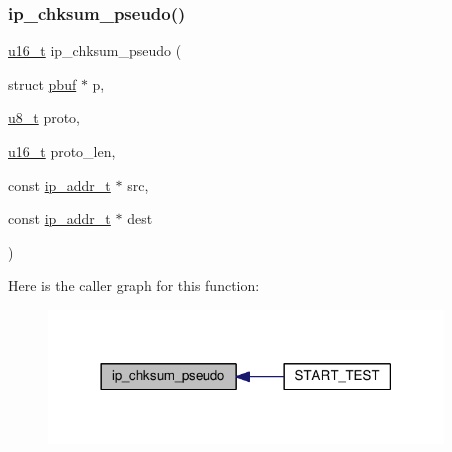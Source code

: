 \subsubsection{\texorpdfstring{ip\+\_\+chksum\+\_\+pseudo()}{ip\_chksum\_pseudo()}}
{\footnotesize\ttfamily \hyperlink{group__compiler__abstraction_ga77570ac4fcab86864fa1916e55676da2}{u16\+\_\+t} ip\+\_\+chksum\+\_\+pseudo (\begin{DoxyParamCaption}\item[{struct \hyperlink{structpbuf}{pbuf} $\ast$}]{p,  }\item[{\hyperlink{group__compiler__abstraction_ga4caecabca98b43919dd11be1c0d4cd8e}{u8\+\_\+t}}]{proto,  }\item[{\hyperlink{group__compiler__abstraction_ga77570ac4fcab86864fa1916e55676da2}{u16\+\_\+t}}]{proto\+\_\+len,  }\item[{const \hyperlink{native_2lwip_2src_2include_2lwip_2ip__addr_8h_a88b43639738c4de2d3cd22e3a1fd7696}{ip\+\_\+addr\+\_\+t} $\ast$}]{src,  }\item[{const \hyperlink{native_2lwip_2src_2include_2lwip_2ip__addr_8h_a88b43639738c4de2d3cd22e3a1fd7696}{ip\+\_\+addr\+\_\+t} $\ast$}]{dest }\end{DoxyParamCaption})}

Here is the caller graph for this function\+:
\nopagebreak
\begin{figure}[H]
\begin{center}
\leavevmode
\includegraphics[width=297pt]{openmote-cc2538_2lwip_2src_2include_2lwip_2inet__chksum_8h_aa13cda42e7c262f5dee243ff6c28422f_icgraph}
\end{center}
\end{figure}
\mbox{\label{openmote-cc2538_2lwip_2src_2include_2lwip_2inet__chksum_8h_acfe7ab6c63ef998210c66bb4822b03b2}} 
